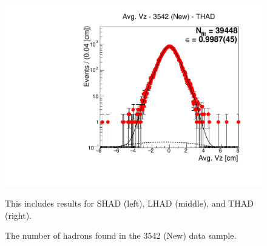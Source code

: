 \begin{figure}[H]
\includegraphics[scale=0.25]{figures/plots/nonDDbar_fit_results/3650_new/fit_new_3542_data_THAD.pdf}
\caption{The number of hadrons found in the 3542 (New) data sample.}
{This includes results for SHAD (left), LHAD (middle), and THAD (right).}
\label{fig:hadron_fits_3542_new}
\end{figure}


